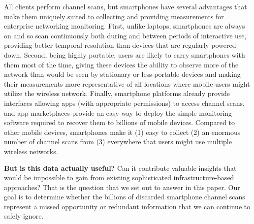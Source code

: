 All \wifi{} clients perform channel scans, but smartphones have several
advantages that make them uniquely suited to collecting and providing
measurements for enterprise networking monitoring. First, unlike laptops,
smartphones are always on and so scan continuously both during and between
periods of interactive use, providing better temporal resolution than devices
that are regularly powered down. Second, being highly portable, users are
likely to carry smartphones with them most of the time, giving these devices
the ability to observe more of the network than would be seen by stationary
or less-portable devices and making their measurements more representative of
all locations where mobile users might utilize the wireless network. Finally,
smartphone platforms already provide interfaces allowing apps (with
appropriate permissions) to access channel scans, and app marketplaces
provide an easy way to deploy the simple monitoring software required to
recover them to billions of mobile devices. Compared to other mobile devices,
smartphones make it (1) easy to collect (2) an enormous number of channel
scans from (3) everywhere that users might use multiple wireless networks.

\textbf{But is this data actually useful?} Can it contribute valuable
insights that would be impossible to gain from existing sophisticated
infrastructure-based approaches? That is the question that we set out to
answer in this paper. Our goal is to determine whether the billions of
discarded smartphone channel scans represent a missed opportunity or
redundant information that we can continue to safely ignore.


